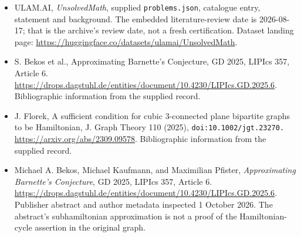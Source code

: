 \documentclass[11pt,a4paper]{article}
\begin{document}
{\small

\begin{itemize}

\item[\hypertarget{source:statement:1}{S1}] ULAM.AI, \emph{UnsolvedMath}, supplied \texttt{problems.json}, catalogue entry, statement and background. The embedded literature-review date is 2026-08-17; that is the archive’s review date, not a fresh certification. Dataset landing page: \url{https://huggingface.co/datasets/ulamai/UnsolvedMath}.

\item[\hypertarget{source:statement:2}{S2}] S. Bekos et al., Approximating Barnette's Conjecture, GD 2025, LIPIcs 357, Article 6. \url{https://drops.dagstuhl.de/entities/document/10.4230/LIPIcs.GD.2025.6}. Bibliographic information from the supplied record.

\item[\hypertarget{source:statement:3}{S3}] J. Florek, A sufficient condition for cubic 3-connected plane bipartite graphs to be Hamiltonian, J. Graph Theory 110 (2025), \nolinkurl{doi:10.1002/jgt.23270.} \url{https://arxiv.org/abs/2309.09578}. Bibliographic information from the supplied record.


\item[E1] Michael A. Bekos, Michael Kaufmann, and
Maximilian Pfister, \emph{Approximating Barnette's Conjecture}, GD 2025,
LIPIcs 357, Article 6. \url{https://drops.dagstuhl.de/entities/document/10.4230/LIPIcs.GD.2025.6}.
Publisher abstract and author metadata inspected 1 October 2026.
The abstract's subhamiltonian approximation is not a proof of the
Hamiltonian-cycle assertion in the original graph.

\end{itemize}

}

\label{end:statement}
\end{document}

